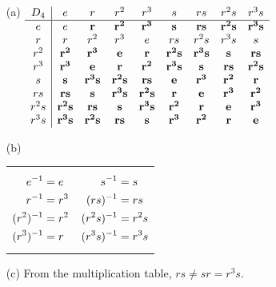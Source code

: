 \documentclass[../UNABRIDGEDalgebraNotesMSRI-UP2016.tex]{subfiles}
\begin{document}
\begin{frame}
\begin{itemize}%
\item[(a)] $\displaystyle
\begin{array}[t]{c | c c c c c c c c}
 D_4  & e & r & r^2 & r^3 & s & rs & r^2s & r^3s \\
 \hline
 e & e & \mathbf {r} & \mathbf {r^2} & \mathbf {r^3} & \mathbf {s} & \mathbf {rs} & \mathbf {r^2s} & \mathbf {r^3s} \\ 
 r & r & r^2 & r^3 & e & rs & r^2s & r^3s & s \\
 r^2 & \mathbf {r^2} & \mathbf {r^3} & \mathbf {e} & \mathbf {r} & \mathbf {r^2s} & \mathbf {r^3s} & \mathbf {s} & \mathbf {rs} \\
 r^3 & \mathbf {r^3} & \mathbf {e} & \mathbf {r} & \mathbf {r^2} & \mathbf {r^3s} & \mathbf {s} & \mathbf {rs} & \mathbf {r^2s} \\
 s & \mathbf {s} & \mathbf {r^3s} & \mathbf {r^2s} & \mathbf {rs} & \mathbf {e} & \mathbf {r^3} & \mathbf {r^2} & \mathbf {r} \\
 rs & \mathbf {rs} & \mathbf {s} & \mathbf {r^3s} & \mathbf {r^2s} & \mathbf {r}  & \mathbf {e} & \mathbf {r^3} & \mathbf {r^2} \\
 r^2s & \mathbf {r^2s} & \mathbf {rs} & \mathbf {s} & \mathbf {r^3s} & \mathbf {r^2} & \mathbf {r} & \mathbf {e} & \mathbf {r^3} \\
 r^3s & \mathbf {r^3s} & \mathbf {r^2s} & \mathbf {rs} & \mathbf {s} & \mathbf {r^3} & \mathbf {r^2} & \mathbf {r} & \mathbf {e}
 \end{array}
$

\smallGap
\item[(b)]
\begin{tabular}[t]{p{}p{}}
\vspace{-1.1pc}
{\begin{align*}
e^{-1} &= e \\
r^{-1} &= r^3 \\
(r^2)^{-1} &= r^2 \\
(r^3)^{-1} &= r
\end{align*}
} 
& \vspace{-1.1pc}
{\begin{align*}
s^{-1} &= s \\
(rs)^{-1} &= rs \\
(r^2s)^{-1} &= r^2s \\
(r^3s)^{-1} &= r^3s
\end{align*}
}
\end{tabular}

\vspace{-1pc}
\item[(c)] From the multiplication table, $rs\neq sr=r^3s$.
\end{itemize}
\end{frame}
\end{document}
